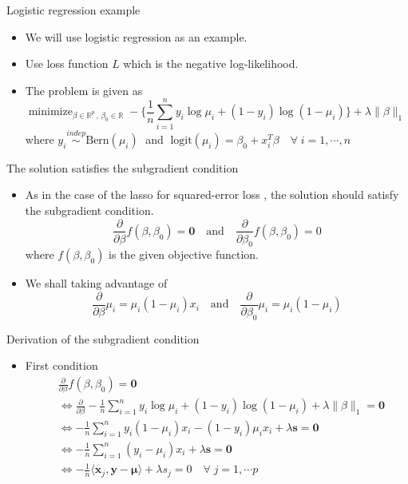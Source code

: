 \documentclass[11pt]{beamer}
\newcommand{\R}{\mathbb{R}}
\begin{document}
\begin{frame}{Logistic regression example}
    \begin{itemize}
        \item We will use logistic regression as an example.
        \item Use loss function $L$ which is the negative log-likelihood.
        \item The problem is given as 
        $$\text{minimize}_{\beta\in \R^p\, ,\, \beta_0\in \R} \; -\Big\{\frac 1 n \sum_{i=1}^n y_i\log \mu_i +(1-y_i)\log(1-\mu_i)\Big\} + \lambda \|\beta\|_1$$
        where $y_i\overset{indep}{\sim} \text{Bern}(\mu_i)\;$ and $\;\text{logit}(\mu_i)=\beta_0+x_i^T\beta\quad \forall \; i=1, \cdots, n$
    \end{itemize}
\end{frame}

\begin{frame}{The solution satisfies the subgradient condition}
    \begin{itemize}
        \item As in the case of the lasso for squared-error loss , the solution should satisfy the subgradient condition.
        $$\frac{\partial}{\partial \beta}f(\beta, \beta_0)=\mathbf{0} \quad \text{and} \quad \frac{\partial}{\partial \beta_0}f(\beta, \beta_0)=0$$ where $f(\beta, \beta_0)$ is the given objective function.
        \item We shall taking advantage of 
        $$\frac{\partial}{\partial\beta}\mu_i = \mu_i(1-\mu_i)x_i \quad \text{and} \quad \frac{\partial}{\partial\beta_0}\mu_i = \mu_i(1-\mu_i)$$
    \end{itemize}
\end{frame}

\begin{frame}{Derivation of the subgradient condition}
    \begin{itemize}
        \item First condition
        \begin{align*}
            &\frac{\partial}{\partial \beta}f(\beta, \beta_0)=\mathbf{0} \\
            &\Leftrightarrow \frac{\partial}{\partial \beta} -\frac 1 n \sum_{i=1}^n y_i\log \mu_i +(1-y_i)\log(1-\mu_i)+\lambda \|\beta\|_1 =\mathbf{0} \\ 
            &\Leftrightarrow -\frac 1n \sum_{i=1}^n y_i(1-\mu_i)x_i - (1-y_i)\mu_i x_i + \lambda \mathbf{s} =\mathbf{0}\\
            &\Leftrightarrow  -\frac 1n \sum_{i=1}^n (y_i-\mu_i)x_i  + \lambda \mathbf{s} =\mathbf{0}\\
            &\Leftrightarrow -\frac 1n \langle \mathbf{x}_j, \mathbf{y}-\mathbf{\mu}\rangle + \lambda s_j=0\quad \forall \; j=1, \cdots p
        \end{align*}
    \end{itemize}
\end{frame}
\end{document}
